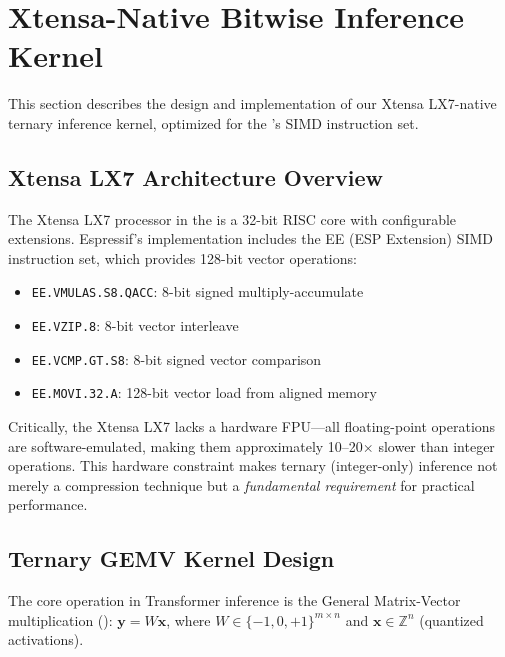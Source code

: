 \section{Xtensa-Native Bitwise Inference Kernel}
\label{sec:kernel}

This section describes the design and implementation of our Xtensa LX7-native
ternary inference kernel, optimized for the \espss{}'s SIMD instruction set.

\subsection{Xtensa LX7 Architecture Overview}

The Xtensa LX7 processor in the \espss{} is a 32-bit RISC core with
configurable extensions. Espressif's implementation includes the EE (ESP
Extension) SIMD instruction set, which provides 128-bit vector operations:

\begin{itemize}[leftmargin=*,topsep=2pt,itemsep=1pt]
  \item \texttt{EE.VMULAS.S8.QACC}: 8-bit signed multiply-accumulate
  \item \texttt{EE.VZIP.8}: 8-bit vector interleave
  \item \texttt{EE.VCMP.GT.S8}: 8-bit signed vector comparison
  \item \texttt{EE.MOVI.32.A}: 128-bit vector load from aligned memory
\end{itemize}

Critically, the Xtensa LX7 lacks a hardware FPU---all floating-point
operations are software-emulated, making them approximately 10--20$\times$
slower than integer operations. This hardware constraint makes ternary
(integer-only) inference not merely a compression technique but a
\emph{fundamental requirement} for practical performance.

\subsection{Ternary GEMV Kernel Design}

The core operation in Transformer inference is the General Matrix-Vector
multiplication (\gemv{}): $\mathbf{y} = W\mathbf{x}$, where
$W \in \{-1, 0, +1\}^{m \times n}$ and $\mathbf{x} \in \mathbb{Z}^n$
(quantized activations).


